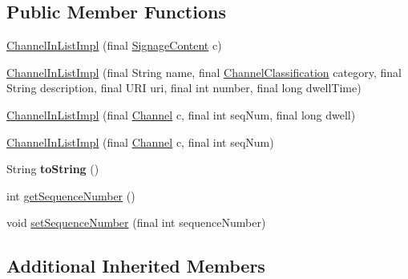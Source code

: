 \subsection*{Public Member Functions}
\begin{DoxyCompactItemize}
\item 
\hyperlink{classgov_1_1fnal_1_1ppd_1_1dd_1_1channel_1_1ChannelInListImpl_a305c35a433a166f8f3d4da96c89971b7}{Channel\-In\-List\-Impl} (final \hyperlink{interfacegov_1_1fnal_1_1ppd_1_1dd_1_1signage_1_1SignageContent}{Signage\-Content} c)
\item 
\hyperlink{classgov_1_1fnal_1_1ppd_1_1dd_1_1channel_1_1ChannelInListImpl_a7da4424fa40cba92ec8534a0925c4065}{Channel\-In\-List\-Impl} (final String name, final \hyperlink{classgov_1_1fnal_1_1ppd_1_1dd_1_1changer_1_1ChannelClassification}{Channel\-Classification} category, final String description, final U\-R\-I uri, final int number, final long dwell\-Time)
\item 
\hyperlink{classgov_1_1fnal_1_1ppd_1_1dd_1_1channel_1_1ChannelInListImpl_a8e42fcff08b52add9a348c9da75acef6}{Channel\-In\-List\-Impl} (final \hyperlink{interfacegov_1_1fnal_1_1ppd_1_1dd_1_1signage_1_1Channel}{Channel} c, final int seq\-Num, final long dwell)
\item 
\hyperlink{classgov_1_1fnal_1_1ppd_1_1dd_1_1channel_1_1ChannelInListImpl_a14e33f31c3c7c15fd601617d8160c53f}{Channel\-In\-List\-Impl} (final \hyperlink{interfacegov_1_1fnal_1_1ppd_1_1dd_1_1signage_1_1Channel}{Channel} c, final int seq\-Num)
\item 
\hypertarget{classgov_1_1fnal_1_1ppd_1_1dd_1_1channel_1_1ChannelInListImpl_ae7951128c28acebbdfb2c5ce5ecc9fb2}{String {\bfseries to\-String} ()}\label{classgov_1_1fnal_1_1ppd_1_1dd_1_1channel_1_1ChannelInListImpl_ae7951128c28acebbdfb2c5ce5ecc9fb2}

\item 
int \hyperlink{classgov_1_1fnal_1_1ppd_1_1dd_1_1channel_1_1ChannelInListImpl_a5e73b434e0de404051c085308bba70b9}{get\-Sequence\-Number} ()
\item 
void \hyperlink{classgov_1_1fnal_1_1ppd_1_1dd_1_1channel_1_1ChannelInListImpl_a3d7875d359431d5e2dc13b60db55cf72}{set\-Sequence\-Number} (final int sequence\-Number)
\end{DoxyCompactItemize}
\subsection*{Additional Inherited Members}



